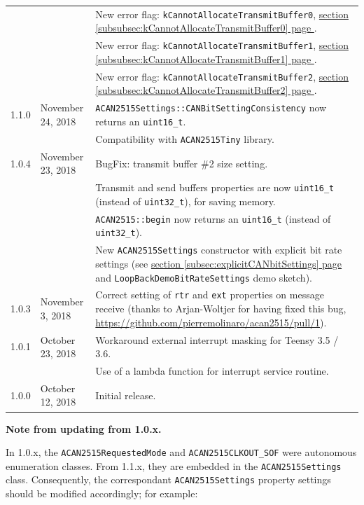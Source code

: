 \documentclass[9pt, a4paper, obeyspaces]{extarticle}
\newcommand\refSubsectionPage[1]{\hyperref[subsec:#1]{section \ref*{subsec:#1} page \pageref{subsec:#1}}}
\newcommand\refSubsubsectionPage[1]{\hyperref[subsubsec:#1]{section \ref*{subsubsec:#1} page \pageref{subsubsec:#1}}}
\begin{document}
\begin{center}
\begin{tabular}{llp{11cm}}
          &                   & New error flag: \texttt{kCannotAllocateTransmitBuffer0}, \refSubsubsectionPage{kCannotAllocateTransmitBuffer0}.\\
          &                   & New error flag: \texttt{kCannotAllocateTransmitBuffer1}, \refSubsubsectionPage{kCannotAllocateTransmitBuffer1}.\\
          &                   & New error flag: \texttt{kCannotAllocateTransmitBuffer2}, \refSubsubsectionPage{kCannotAllocateTransmitBuffer2}.\\
    1.1.0 & November 24, 2018 & \texttt{ACAN2515Settings::CANBitSettingConsistency} now returns an \texttt{uint16\_t}. \\
          &                   & Compatibility with \texttt{ACAN2515Tiny} library.\\
    1.0.4 & November 23, 2018 & BugFix: transmit buffer \#2 size setting. \\
          &                   & Transmit and send buffers properties are now \texttt{uint16\_t} (instead of \texttt{uint32\_t}), for saving memory. \\
          &                   & \texttt{ACAN2515::begin} now returns an \texttt{uint16\_t} (instead of \texttt{uint32\_t}).\\
          &                   & New \texttt{ACAN2515Settings} constructor with explicit bit rate settings (see \refSubsectionPage{explicitCANbitSettings} and \texttt{LoopBackDemoBitRateSettings} demo sketch).\\
    1.0.3 & November 3, 2018 & Correct setting of \texttt{rtr} and \texttt{ext} properties on message receive (thanks to Arjan-Woltjer for having fixed this bug, \url{https://github.com/pierremolinaro/acan2515/pull/1}). \\
    1.0.1 & October 23, 2018 & Workaround external interrupt masking for Teensy 3.5 / 3.6.\\
          &                  & Use of a lambda function for interrupt service routine. \\
    1.0.0 & October 12, 2018 & Initial release. \\
  \end{tabular}
\end{center}

{\bf Note from updating from 1.0.x.}

In 1.0.x, the \texttt{ACAN2515RequestedMode} and \texttt{ACAN2515CLKOUT\_SOF} were autonomous enumeration classes. From 1.1.x, they are embedded in the \texttt{ACAN2515Settings} class. Consequently, the correspondant \texttt{ACAN2515Settings} property settings should be modified accordingly; for example:
\end{document}
